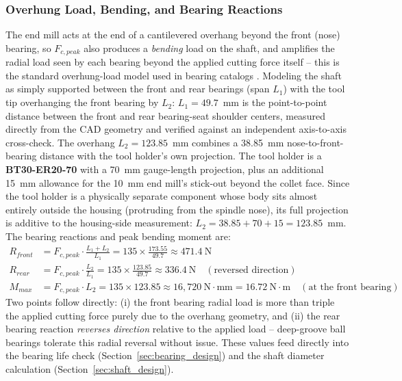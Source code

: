 \documentclass[12pt,a4paper]{report}
\begin{document}
	\subsubsection{Overhung Load, Bending, and Bearing Reactions}\label{sec:overhung_bending}
	The end mill acts at the end of a cantilevered overhang beyond the front (nose) bearing, so
	$F_{c,peak}$ also produces a \emph{bending} load on the shaft, and amplifies the radial load
	seen by each bearing beyond the applied cutting force itself -- this is the standard
	overhung-load model used in bearing catalogs \cite{ref1}. Modeling the shaft as simply
	supported between the front and rear bearings (span $L_1$) with the tool tip overhanging the
	front bearing by $L_2$: $L_1 = 49.7$~mm is the point-to-point distance between the front and
	rear bearing-seat shoulder centers, measured directly from the CAD geometry and verified
	against an independent axis-to-axis cross-check. The overhang $L_2 = 123.85$~mm combines a
	38.85~mm nose-to-front-bearing distance with the tool holder's own projection. The tool
	holder is a \textbf{BT30-ER20-70} with a 70~mm gauge-length projection, plus an additional
	15~mm allowance for the 10~mm end mill's stick-out beyond the collet face. Since the
	tool holder is a physically separate component whose body sits almost entirely outside the
	housing (protruding from the spindle nose), its full projection is additive to the
	housing-side measurement:
	$L_2 = 38.85 + 70 + 15 = 123.85$~mm. The bearing reactions and peak bending moment are:
	\begin{align}
		R_{front} &= F_{c,peak}\cdot\frac{L_1+L_2}{L_1} = 135 \times \frac{173.55}{49.7} \approx 471.4~\text{N} \\
		R_{rear} &= F_{c,peak}\cdot\frac{L_2}{L_1} = 135 \times \frac{123.85}{49.7} \approx 336.4~\text{N} \quad (\text{reversed direction}) \\
		M_{max} &= F_{c,peak}\cdot L_2 = 135 \times 123.85 \approx 16{,}720~\text{N}\cdot\text{mm} = 16.72~\text{N}\cdot\text{m} \quad (\text{at the front bearing})
	\end{align}
	Two points follow directly: (i) the front bearing radial load is more than triple the applied
	cutting force purely due to the overhang geometry, and (ii) the rear bearing reaction
	\emph{reverses direction} relative to the applied load -- deep-groove ball bearings tolerate
	this radial reversal without issue. These values feed directly into the bearing
	life check (Section~\ref{sec:bearing_design}) and the shaft diameter calculation (Section~\ref{sec:shaft_design}).
	
\end{document}
